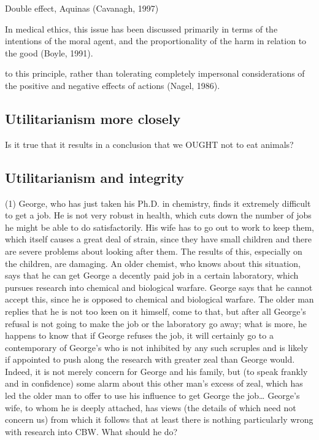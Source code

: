 

Double effect, Aquinas (Cavanagh, 1997)

In medical ethics, this issue has been discussed primarily in
terms of the intentions of the moral agent, and the proportionality of the harm in relation to the good (Boyle, 1991).

to this principle, rather than
tolerating completely impersonal considerations of the positive
and negative effects of actions (Nagel, 1986).

\subsection{Utilitarianism more closely}

Is it true that it results in a conclusion that we OUGHT not to eat animals?  


\subsection{Utilitarianism and integrity}

(1) George, who has just taken his Ph.D. in chemistry, finds it extremely difficult
to get a job. He is not very robust in health, which cuts down the number of jobs
he might be able to do satisfactorily. His wife has to go out to work to keep
them, which itself causes a great deal of strain, since they have small children
and there are severe problems about looking after them. The results of this,
especially on the children, are damaging. An older chemist, who knows about
this situation, says that he can get George a decently paid job in a certain
laboratory, which pursues research into chemical and biological warfare. George
says that he cannot accept this, since he is opposed to chemical and biological
warfare. The older man replies that he is not too keen on it himself, come to that,
but after all George’s refusal is not going to make the job or the laboratory go away;
what is more, he happens to know that if George refuses the job, it will certainly
go to a contemporary of George’s who is not inhibited by any such scruples and
is likely if appointed to push along the research with greater zeal than George
would. Indeed, it is not merely concern for George and his family, but (to speak
frankly and in confidence) some alarm about this other man’s excess of zeal,
which has led the older man to offer to use his influence to get George the job…
George’s wife, to whom he is deeply attached, has views (the details of which
need not concern us) from which it follows that at least there is nothing
particularly wrong with research into CBW. What should he do?

